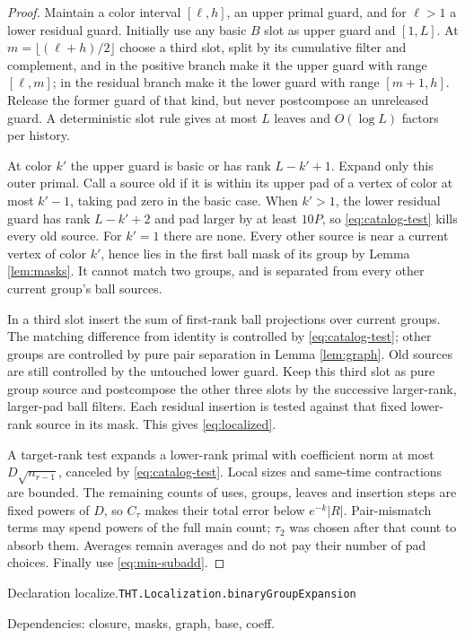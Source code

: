 \documentclass[11pt]{article}
\theoremstyle{definition}
\numberwithin{equation}{section}
\newcommand{\bp}[3]{\par\smallskip\begingroup\footnotesize
\noindent\hypertarget{bp:#1}{\textsf{Declaration #1.}}\quad\nolinkurl{#2}\par
\noindent\textsf{Dependencies:} #3.\par\endgroup\smallskip}
\begin{document}
\begin{proof}
Maintain a color interval $[\ell,h]$, an upper primal guard, and for $\ell>1$ a lower residual guard. Initially use any basic $B$ slot as upper guard and $[1,L]$. At $m=\lfloor(\ell+h)/2\rfloor$ choose a third slot, split by its cumulative filter and complement, and in the positive branch make it the upper guard with range $[\ell,m]$; in the residual branch make it the lower guard with range $[m+1,h]$. Release the former guard of that kind, but never postcompose an unreleased guard. A deterministic slot rule gives at most $L$ leaves and $O(\log L)$ factors per history.

At color $k'$ the upper guard is basic or has rank $L-k'+1$. Expand only this outer primal. Call a source old if it is within its upper pad of a vertex of color at most $k'-1$, taking pad zero in the basic case. When $k'>1$, the lower residual guard has rank $L-k'+2$ and pad larger by at least $10P$, so \eqref{eq:catalog-test} kills every old source. For $k'=1$ there are none. Every other source is near a current vertex of color $k'$, hence lies in the first ball mask of its group by Lemma \ref{lem:masks}. It cannot match two groups, and is separated from every other current group's ball sources.

In a third slot insert the sum of first-rank ball projections over current groups. The matching difference from identity is controlled by \eqref{eq:catalog-test}; other groups are controlled by pure pair separation in Lemma \ref{lem:graph}. Old sources are still controlled by the untouched lower guard. Keep this third slot as pure group source and postcompose the other three slots by the successive larger-rank, larger-pad ball filters. Each residual insertion is tested against that fixed lower-rank source in its mask. This gives \eqref{eq:localized}.

A target-rank test expands a lower-rank primal with coefficient norm at most $D\sqrt{n_{r-1}}$, canceled by \eqref{eq:catalog-test}. Local sizes and same-time contractions are bounded. The remaining counts of uses, groups, leaves and insertion steps are fixed powers of $D$, so $C_\tau$ makes their total error below $e^{-k}|R|$. Pair-mismatch terms may spend powers of the full main count; $\tau_2$ was chosen after that count to absorb them. Averages remain averages and do not pay their number of pad choices. Finally use \eqref{eq:min-subadd}.
\end{proof}
\bp{localize}{THT.Localization.binaryGroupExpansion}{closure, masks, graph, base, coeff}
\end{document}
